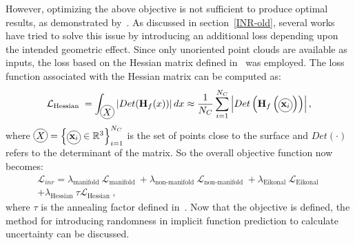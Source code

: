 However, optimizing the above objective is not sufficient to produce optimal results, as demonstrated by~\cite{DiGS, NeuralHessian}. As discussed in section~\ref{INR-old}, several works have tried to solve this issue by introducing an additional loss depending upon the intended geometric effect. Since only unoriented point clouds are available as inputs, the loss based on the Hessian matrix defined in~\cite{NeuralHessian} was employed. The loss function associated with the Hessian matrix can be computed as:
\begin{equation}\label{Hessian1}
    \mathcal{L}_{\text{Hessian }} = \int_{\circled{$X$}} \left|Det(\mathbf{H}_f(x))\right| d x \approx \frac{1}{N_C}\sum_{i=1}^{N_C} \left|Det\left(\mathbf{H}_f\left(\circled{$\mathbf{x}_i$}\right)\right)\right|,
\end{equation}
where $\circled{$X$}=\left\{\circled{$\mathbf{x}_i$} \in \mathbb{R}^{3}\right\}_{i=1}^{N_C}$ is the set of points close to the surface and $Det(\cdot)$ refers to the determinant of the matrix. So the overall objective function now becomes:
\begin{equation}\label{Hessian2}
    \begin{aligned}
        \mathcal{L}_{inr}= \lambda_{\text {manifold }} \mathcal{L}_{\text {manifold }}+\lambda_{\text {non-manifold }} \mathcal{L}_{\text {non-manifold }}+ \lambda_{\text {Eikonal }} \mathcal{L}_{\text {Eikonal }}
        \\
        +\lambda_{\text{Hessian }} \tau \mathcal{L}_{\text{Hessian }},
    \end{aligned}
\end{equation}
where $\tau$ is the annealing factor defined in~\cite{NeuralHessian}. Now that the objective is defined, the method for introducing randomness in implicit function prediction to calculate uncertainty can be discussed.


